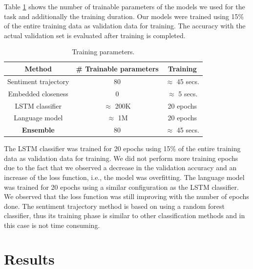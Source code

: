 \documentclass{article}
\newcommand{\lstm}{LSTM }
\begin{document}
Table \ref{tab:params} shows the number of trainable parameters of the models we
used for the task and additionally the training duration. Our models were
trained using 15\% of the entire training data as validation data for training.
The accuracy with the actual validation set is evaluated after training is
completed. 

\begin{table}
    \caption{Training parameters.}
    \begin{center}
        \label{tab:params}
        \begin{tabular}{||c c c||} 
            \hline
            Method                 & \# Trainable parameters   & Training \\ [0.5ex] 
            \hline\hline
            Sentiment trajectory   & 80                        & $ \approx $ 45 secs. \\ 
            \hline
            Embedded closeness     & 0                         & $ \approx $ 5 secs.  \\
            \hline
            LSTM classifier        & $ \approx $ 200K          & 20 epochs \\ %
            \hline
            Language model         & $ \approx $ 1M            & 20 epochs \\ %
            \hline
            \textbf{Ensemble}      & 80                        & $ \approx $ 45 secs.  \\ [1ex] 
            \hline
        \end{tabular}
    \end{center}
\end{table}

The \lstm classifier was trained for 20 epochs using 15\% of the entire training
data as validation data for training. We did not perform more training epochs
due to the fact that we observed a decrease in the validation accuracy and an
increase of the loss function, i.e., the model was overfitting.  The language
model was trained for 20 epochs using a similar configuration as the \lstm
classifier. We observed that the loss function was still improving with the
number of epochs done. The sentiment trajectory method is based on using a
random forest classifier, thus its training phase is similar to other
classification methods and in this case is not time consuming.

\section{Results}
\label{sec:results}
\end{document}
